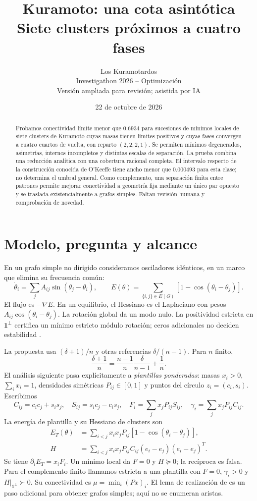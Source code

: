 \documentclass[10pt,a4paper]{article}
\title{\vspace{-1.2cm}Kuramoto: una cota asintótica\\Siete clusters próximos a cuatro fases}
\author{Los Kuramotardos\\
\small Investigathon 2026 -- Optimización\\
\small Versión ampliada para revisión; asistida por IA}
\date{22 de octubre de 2026}
\begin{document}
\maketitle
\vspace{-0.7cm}
\begin{abstract}
Probamos conectividad límite menor que $0.6934$ para sucesiones de mínimos locales de siete clusters de Kuramoto cuyas masas tienen límites positivos y cuyas fases convergen a cuatro cuartos de vuelta, con reparto $(2,2,2,1)$. Se permiten mínimos degenerados, asimetrías, internos incompletos y distintas escalas de separación. La prueba combina una reducción analítica con una cobertura racional completa. El intervalo respecto de la construcción conocida de O'Keeffe tiene ancho menor que $0.000493$ para esta clase; no determina el umbral general. Como complemento, una separación finita entre patrones permite mejorar conectividad a geometría fija mediante un único par opuesto y se traslada existencialmente a grafos simples. Faltan revisión humana y comprobación de novedad.
\end{abstract}

\section{Modelo, pregunta y alcance}
En un grafo simple no dirigido consideramos osciladores idénticos, en un marco que elimina su frecuencia común:
\[
 \dot\theta_i=\sum_j A_{ij}\sin(\theta_j-\theta_i),\qquad
 E(\theta)=\sum_{\{i,j\}\in E(G)}[1-\cos(\theta_i-\theta_j)].
\]
El flujo es $-\nabla E$. En un equilibrio, el Hessiano es el Laplaciano con pesos $A_{ij}\cos(\theta_i-\theta_j)$. La rotación global da un modo nulo. La positividad estricta en $\mathbf1^\perp$ certifica un mínimo estricto módulo rotación; ceros adicionales no deciden estabilidad \cite{bullo}.

La propuesta usa $(\delta+1)/n$ y otras referencias $\delta/(n-1)$. Para $n$ finito,
\[
 \frac{\delta+1}{n}=\frac{n-1}{n}\frac{\delta}{n-1}+\frac1n.
\]
El análisis siguiente pasa explícitamente a \emph{plantillas ponderadas}: masas $x_i>0$, $\sum_i x_i=1$, densidades simétricas $P_{ij}\in[0,1]$ y puntos del círculo $z_i=(c_i,s_i)$. Escribimos
\[
 C_{ij}=c_ic_j+s_is_j,\quad S_{ij}=s_ic_j-c_is_j,\quad
 F_i=\sum_jx_jP_{ij}S_{ij},\quad \gamma_i=\sum_jx_jP_{ij}C_{ij}.
\]
La energía de plantilla y su Hessiano de clusters son
\[
\begin{aligned}
 E_T(\theta)&=\sum_{i<j}x_ix_jP_{ij}[1-\cos(\theta_i-\theta_j)],\\
 H&=\sum_{i<j}x_ix_jP_{ij}C_{ij}(e_i-e_j)(e_i-e_j)^T.
\end{aligned}
\]
Se tiene $\partial_iE_T=x_iF_i$. Un mínimo local da $F=0$ y $H\succeq0$; la recíproca es falsa. Para el complemento finito llamamos estricta a una plantilla con $F=0$, $\gamma_i>0$ y $H|_{\mathbf1^\perp}\succ0$. Su conectividad es $\mu=\min_i(Px)_i$. El lema de realización de \cite{okeeffe} es un paso adicional para obtener grafos simples; aquí no se enumeran aristas.
\end{document}

